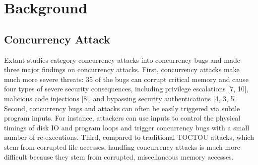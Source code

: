 \section{Background}\label{sec:background}


\subsection{Concurrency Attack}


Extant studies \cite{con:hotpar12, acidrain:sigmod17} category concurrency 
attacks into  
concurrency bugs and made three major findings on concurrency
attacks. First, concurrency attacks make much more severe threats:
35 of the bugs can corrupt critical memory and cause four
types of severe security consequences, including privilege escalations [7, 10],
malicious code injections [8], and bypassing security authentications
[4, 3, 5].
Second, concurrency bugs and attacks can often be easily
triggered via subtle program inputs. For instance, attackers
can use inputs to control the physical timings of disk
IO and program loops and trigger concurrency bugs with a
small number of re-executions. Third, compared to traditional
TOCTOU attacks, which stem from corrupted file accesses,
handling concurrency attacks is much more difficult because
they stem from corrupted, miscellaneous memory accesses.





